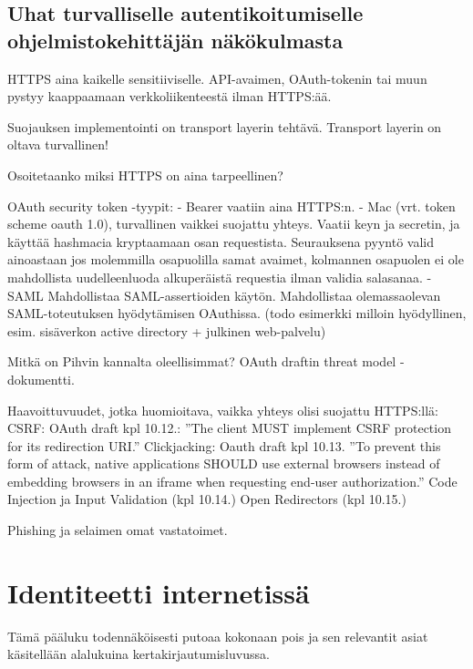 \documentclass[finnish,gradu]{tktltiki}
\begin{document}

  \subsection{Uhat turvalliselle autentikoitumiselle ohjelmistokehittäjän näkökulmasta} %
  \label{sec:uhat_turvalliselle_autentikoitumiselle}
    HTTPS aina kaikelle sensitiiviselle. API-avaimen, OAuth-tokenin tai muun pystyy kaappaamaan verkkoliikenteestä ilman HTTPS:ää.

    Suojauksen implementointi on transport layerin tehtävä. Transport layerin on oltava turvallinen!

    Osoitetaanko miksi HTTPS on aina tarpeellinen?

    OAuth security token -tyypit:
    - Bearer vaatiin aina HTTPS:n.
    - Mac (vrt. token scheme oauth 1.0), turvallinen vaikkei suojattu yhteys. Vaatii keyn ja secretin, ja käyttää hashmacia kryptaamaan osan requestista. Seurauksena pyyntö valid ainoastaan jos molemmilla osapuolilla samat avaimet, kolmannen osapuolen ei ole mahdollista uudelleenluoda alkuperäistä requestia ilman validia salasanaa.
    - SAML Mahdollistaa SAML-assertioiden käytön. Mahdollistaa olemassaolevan SAML-toteutuksen hyödytämisen OAuthissa. (todo esimerkki milloin hyödyllinen, esim. sisäverkon active directory + julkinen web-palvelu)

    Mitkä on Pihvin kannalta oleellisimmat?
    OAuth draftin threat model -dokumentti.

    Haavoittuvuudet, jotka huomioitava, vaikka yhteys olisi suojattu HTTPS:llä:
    CSRF: OAuth draft kpl 10.12.: ''The client MUST implement CSRF protection for its redirection URI.''
    Clickjacking: Oauth draft kpl 10.13.
       ''To prevent this form of attack, native applications SHOULD use
       external browsers instead of embedding browsers in an iframe when
       requesting end-user authorization.''
    Code Injection ja Input Validation (kpl 10.14.)
    Open Redirectors (kpl 10.15.)

    Phishing ja selaimen omat vastatoimet.




\section{Identiteetti internetissä} %
\label{sec:identiteetti_internetissä}
  Tämä pääluku todennäköisesti putoaa kokonaan pois ja sen relevantit asiat käsitellään alalukuina kertakirjautumisluvussa.
\end{document}
